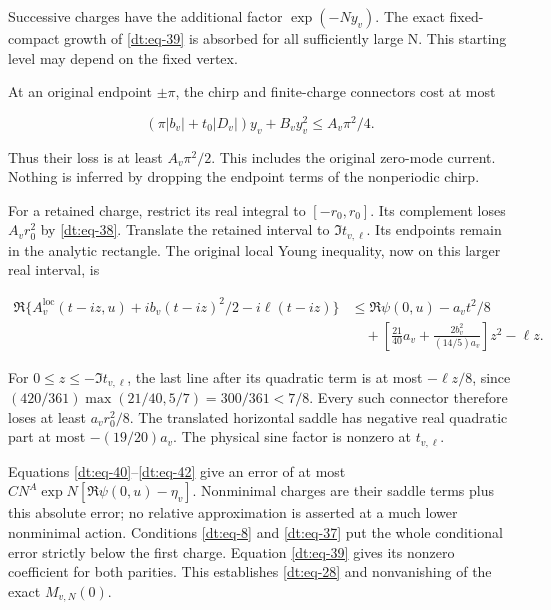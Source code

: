 Successive charges have the additional factor \(\exp(-Ny_v)\). The exact
fixed-compact growth of \eqref{dt:eq-39} is absorbed for all sufficiently large N.
This starting level may depend on the fixed vertex.

At an original endpoint \(\pm\pi\), the chirp and finite-charge connectors cost
at most

\begin{equation}\label{dt:eq-41}
(\pi|b_v|+t_0|D_v|)y_v+B_vy_v^2
                            \le A_v\pi^2/4.
\end{equation}

Thus their loss is at least \(A_v\pi^2/2\). This includes the original
zero-mode current. Nothing is inferred by dropping the endpoint terms
of the nonperiodic chirp.

For a retained charge, restrict its real integral to \([-r_0,r_0]\).
Its complement loses \(A_vr_0^2\) by \eqref{dt:eq-38}. Translate the retained interval
to \(\Im t_{v,\ell}\). Its endpoints remain in the analytic rectangle. The
original local Young inequality, now on this larger real interval,
is

\begin{equation}\label{dt:eq-42}
\begin{aligned}
 \Re\{A_v^{\mathrm{loc}}(t-iz,u)+ib_v(t-iz)^2/2-i\ell(t-iz)\}
 &\le\Re\psi(0,u)-a_vt^2/8\\
 &\quad+\left[\frac{21}{40}a_v+
                 \frac{2b_v^2}{(14/5)a_v}\right]z^2-\ell z.
\end{aligned}
\end{equation}

For \(0\le z\le-\Im t_{v,\ell}\), the last line after its quadratic term is
at most \(-\ell z/8\), since \((420/361)\max(21/40,5/7)=300/361<7/8\).
Every such connector therefore loses at least \(a_vr_0^2/8\).
The translated horizontal saddle has negative real quadratic part
at most \(-(19/20)a_v\). The physical sine factor is nonzero at \(t_{v,\ell}\).

Equations \eqref{dt:eq-40}--\eqref{dt:eq-42} give an error of at most
\(CN^A\exp N[\Re\psi(0,u)-\eta_v]\). Nonminimal charges are their saddle
terms plus this absolute error; no relative approximation is asserted
at a much lower nonminimal action. Conditions \eqref{dt:eq-8} and \eqref{dt:eq-37} put the
whole conditional error strictly below the first charge. Equation
\eqref{dt:eq-39} gives its nonzero coefficient for both parities. This establishes
\eqref{dt:eq-28} and nonvanishing of the exact \(M_{v,N}(0)\).

